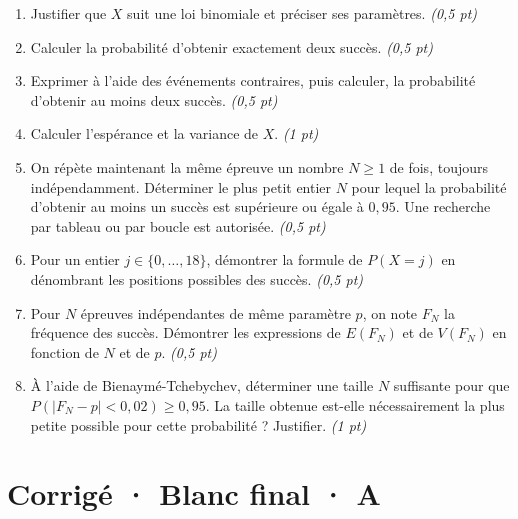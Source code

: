 \begin{enumerate}

\item Justifier que $X$ suit une loi binomiale et préciser ses paramètres. \hfill\textit{(0,5 pt)}

\item Calculer la probabilité d'obtenir exactement deux succès. \hfill\textit{(0,5 pt)}

\item Exprimer à l'aide des événements contraires, puis calculer, la probabilité d'obtenir au moins deux succès. \hfill\textit{(0,5 pt)}

\item Calculer l'espérance et la variance de $X$. \hfill\textit{(1 pt)}

\item On répète maintenant la même épreuve un nombre $N\ge1$ de fois, toujours indépendamment. Déterminer le plus petit entier $N$ pour lequel la probabilité d'obtenir au moins un succès est supérieure ou égale à $0{,}95$. Une recherche par tableau ou par boucle est autorisée. \hfill\textit{(0,5 pt)}

\item Pour un entier $j\in\{0,\ldots,18\}$, démontrer la formule de $P(X=j)$ en dénombrant les positions possibles des succès. \hfill\textit{(0,5 pt)}

\item Pour $N$ épreuves indépendantes de même paramètre $p$, on note $F_N$ la fréquence des succès. Démontrer les expressions de $E(F_N)$ et de $V(F_N)$ en fonction de $N$ et de $p$. \hfill\textit{(0,5 pt)}

\item À l'aide de Bienaymé-Tchebychev, déterminer une taille $N$ suffisante pour que $P(|F_N-p|<0{,}02)\ge0{,}95$. La taille obtenue est-elle nécessairement la plus petite possible pour cette probabilité ? Justifier. \hfill\textit{(1 pt)}

\end{enumerate}

\ifprof\clearpage

\section*{Corrigé · Blanc final · A}\label{cor:9-3}

